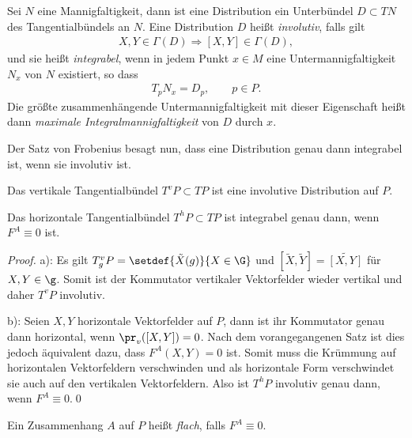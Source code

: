 \documentclass[%
	paper=a5,%
	fleqn,%
	DIV=18,%
	BCOR=0mm,
	fontsize=11pt,
	titlepage=false,%
	bibliography=totoc,
	DIV=18,%
	twoside=true,
	pdftitle=Riemannsche Geometrie,
	pdfauthor=Uwe Semmelmann,
	numbers=noendperiod]%
	{scrbook}
\begin{document}
\begin{rem}[Erinnerung.]
Sei $N$ eine Mannigfaltigkeit, dann ist eine Distribution ein Unterbündel
$D\subset TN$ des Tangentialbündels an $N$. Eine Distribution $D$ heißt
\emph{involutiv}, falls gilt
\begin{align*}
X,Y\in \Gamma(D) \Rightarrow [X,Y]\in\Gamma(D),
\end{align*} 
und sie heißt \emph{integrabel}, wenn in jedem Punkt $x\in M$ eine
Untermannigfaltigkeit $N_x$ von $N$ existiert, so dass
\begin{align*}
T_p N_x = D_p,\qquad p\in P.
\end{align*}
Die größte zusammenhängende Untermannigfaltigkeit mit dieser Eigenschaft heißt
dann \emph{maximale Integralmannigfaltigkeit} von $D$ durch $x$.

Der Satz von Frobenius besagt nun, dass eine Distribution genau dann integrabel
ist, wenn sie involutiv ist.\map
\end{rem}

\begin{prop}
\label{prop:Integrabilität-Krümmung}
\begin{propenum}
\item Das vertikale Tangentialbündel $T^vP\subset TP$ ist eine involutive
Distribution auf $P$.
\item Das horizontale Tangentialbündel $T^hP\subset TP$ ist integrabel genau
dann, wenn $F^A \equiv 0$ ist.\fish
\end{propenum}
\end{prop}
\begin{proof}
a): Es gilt $T^v_gP = \setdef{\tilde{X}(g)}{X\in\G}$ und 
$[\tilde{X},\tilde{Y}] = \widetilde{[X,Y]}$ für $X,Y\in\g$. Somit ist der
Kommutator vertikaler Vektorfelder wieder vertikal und daher $T^vP$ involutiv.

b): Seien $X,Y$ horizontale Vektorfelder auf $P$, dann ist ihr Kommutator genau
dann horizontal, wenn $\pr_v([X,Y]) = 0$. Nach dem vorangegangenen Satz ist dies
jedoch äquivalent dazu, dass $F^A(X,Y) = 0$ ist. Somit muss die Krümmung
auf horizontalen Vektorfeldern verschwinden und als horizontale Form
verschwindet sie auch auf den vertikalen Vektorfeldern. Also ist $T^hP$
involutiv genau dann, wenn $F^A\equiv 0$.\qed
\end{proof}

\begin{defn}
Ein Zusammenhang $A$ auf $P$ heißt \emph{flach}, falls $F^A\equiv 0$.\fish
\end{defn}
\end{document}
